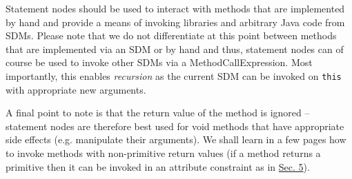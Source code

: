 Statement nodes should be used to interact with methods that are implemented by hand and provide a means of invoking libraries and arbitrary Java code from
SDMs. Please note that we do not differentiate at this point between methods that are implemented via an SDM or by hand and thus, statement nodes can of course
be used to invoke other SDMs via a MethodCallExpression. Most importantly, this enables \emph{recursion} as the current SDM can be invoked on \texttt{this} with
appropriate new arguments.

A final point to note is that the return value of the method is ignored -- statement nodes are therefore best used for void methods that have appropriate
side effects (e.g. manipulate their arguments). We shall learn in a few pages how to invoke methods with non-primitive return values (if a method returns a
primitive then it can be invoked in an attribute constraint as in \hyperlink{sec:growBox}{Sec. 5}). %



\begin{figure}[htbp]
   \centering
      \qquad
      \caption{}
\end{figure}
\FloatBarrier

